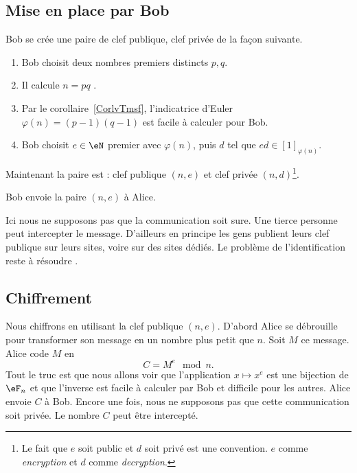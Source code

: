 \subsection{Mise en place par Bob}

Bob se crée une paire de clef publique, clef privée de la façon suivante.
\begin{enumerate}
    \item
        Bob choisit deux nombres premiers distincts \( p,q\).
    \item
        Il calcule \( n=pq\) .
    \item
        Par le corollaire~\ref{CorlvTmsf}, l'indicatrice d'Euler \( \varphi(n)=(p-1)(q-1)\) est facile à calculer pour Bob.
    \item
        Bob choisit \( e\in \eN\) premier avec \( \varphi(n)\), puis \( d\) tel que \( ed\in[1]_{\varphi(n)}\).
\end{enumerate}
Maintenant la paire est : clef publique \( (n,e)\) et clef privée \( (n,d)\)\footnote{Le fait que \( e\) soit public et \( d\) soit privé est une convention. \( e\) comme  \emph{encryption} et \( d\) comme \emph{decryption}.}.

Bob envoie la paire \( (n,e)\) à Alice.

\begin{remark}
    Ici nous ne supposons pas que la communication soit sure. Une tierce personne peut intercepter le message. D'ailleurs en principe les gens publient leurs clef publique sur leurs sites, voire sur des sites dédiés. Le problème de l'identification reste à résoudre .
\end{remark}

\subsection{Chiffrement}

Nous chiffrons en utilisant la clef publique \( (n,e)\). D'abord Alice se débrouille pour transformer son message en un nombre plus petit que \( n\). Soit \( M\) ce message. Alice code \( M\) en
\begin{equation}
    C=M^e\mod n.
\end{equation}
Tout le truc est que nous allons voir que l'application \( x\mapsto x^e\) est une bijection de \( \eF_n\) et que l'inverse est facile à calculer par Bob et difficile pour les autres. Alice envoie \( C\) à Bob. Encore une fois, nous ne supposons pas que cette communication soit privée. Le nombre \( C\) peut être intercepté.

